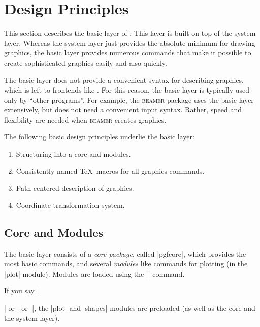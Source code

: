 %
%
%


\section[base-design]{Design Principles}

This section describes the basic layer of \pgfname. This layer is built on top
of the system layer. Whereas the system layer just provides the absolute
minimum for drawing graphics, the basic layer provides numerous commands that
make it possible to create sophisticated graphics easily and also quickly.

The basic layer does not provide a convenient syntax for describing graphics,
which is left to frontends like \tikzname. For this reason, the basic layer is
typically used only by ``other programs''. For example, the \textsc{beamer}
package uses the basic layer extensively, but does not need a convenient input
syntax. Rather, speed and flexibility are needed when \textsc{beamer} creates
graphics.

The following basic design principles underlie the basic layer:
%
\begin{enumerate}
    \item Structuring into a core and modules.
    \item Consistently named \TeX\ macros for all graphics commands.
    \item Path-centered description of graphics.
    \item Coordinate transformation system.
\end{enumerate}


\subsection{Core and Modules}

The basic layer consists of a \emph{core package}, called |pgfcore|, which
provides the most basic commands, and several \emph{modules} like commands for
plotting (in the |plot| module). Modules are loaded using the |\usepgfmodule|
command.

If you say |\usepackage{pgf}| or | or |\usemodule[pgf]|, the
|plot| and |shapes| modules are preloaded (as well as the core and the system
layer).


